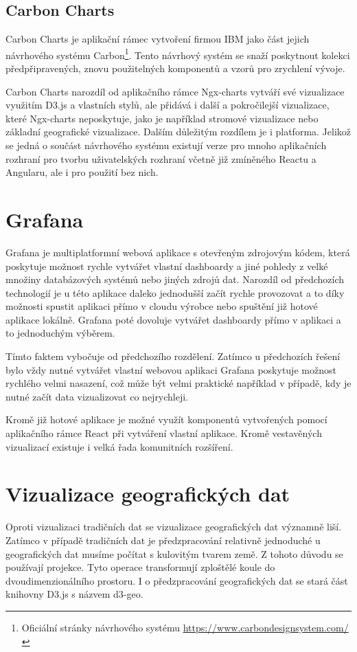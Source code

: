 \subsection*{Carbon Charts}
Carbon Charts je aplikační rámec vytvoření firmou IBM jako část jejich návrhového systému Carbon\footnote{Oficiální stránky návrhového systému \url{https://www.carbondesignsystem.com/}}. Tento návrhový systém se snaží poskytnout kolekci předpřipravených, znovu použitelných komponentů a vzorů pro zrychlení vývoje. 

Carbon Charts narozdíl od aplikačního rámce Ngx-charts vytváří své vizualizace využitím D3.js a vlastních stylů, ale přidává i další a pokročilejší vizualizace, které Ngx-charts neposkytuje, jako je například stromové vizualizace nebo základní geografické vizualizace. Dalším důležitým rozdílem je i platforma. Jelikož se jedná o součást návrhového systému existují verze pro mnoho aplikačních rozhraní pro tvorbu uživatelských rozhraní včetně již zmíněného Reactu a Angularu, ale i pro použití bez nich.

\section{Grafana}

Grafana je multiplatformní webová aplikace s otevřeným zdrojovým kódem, která poskytuje možnost rychle vytvářet vlastní dashboardy a jiné pohledy z velké množiny databázových systémů nebo jiných zdrojů dat. Narozdíl od předchozích technologií je u této aplikace daleko jednodušší začít rychle provozovat a to díky možnosti spustit aplikaci přímo v cloudu výrobce nebo spuštění již hotové aplikace lokálně. Grafana poté dovoluje vytvářet dashboardy přímo v aplikaci a to jednoduchým výběrem.

Tímto faktem vybočuje od předchozího rozdělení. Zatímco u předchozích řešení bylo vždy nutné vytvářet vlastní webovou aplikaci Grafana poskytuje možnost rychlého velmi nasazení, což může být velmi praktické například v případě, kdy je nutné začít data vizualizovat co nejrychleji.

Kromě již hotové aplikace je možné využít komponentů vytvořených pomocí aplikačního rámce React při vytváření vlastní aplikace. Kromě vestavěných vizualizací existuje i velká řada komunitních rozšíření. 

\section{Vizualizace geografických dat}
Oproti vizualizaci tradičních dat se vizualizace geografických dat významně liší. Zatímco v případě tradičních dat je předzpracování relativně jednoduché u geografických dat musíme počítat s kulovitým tvarem země. Z tohoto důvodu se používají projekce. Tyto operace transformují zploštělé koule do dvoudimenzionálního prostoru. I o předzpracování geografických dat se stará část knihovny D3.js s názvem d3-geo.

